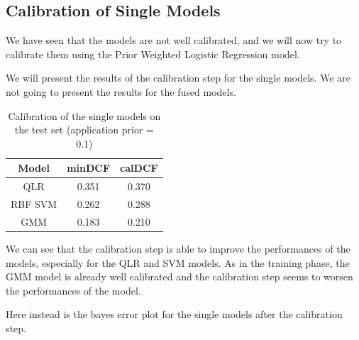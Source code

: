 \documentclass[12pt]{report}
\newcommand{\nl}{%
    \newline
    \noindent
}
\begin{document}
\subsection*{Calibration of Single Models}
We have seen that the models are not well calibrated, and we will now try to calibrate them using the Prior Weighted Logistic Regression model.
\nl
We will present the results of the calibration step for the single models. We are not going to present the results for the fused models.
\begin{table}[H]
    \centering
    \begin{tabular}{|c|c|c|}
        \hline
        \rowcolor{blue!10}
        \textbf{Model} & \textbf{minDCF} & \textbf{calDCF} \\
        \hline
        QLR            & 0.351           & 0.370           \\
        \hline
        RBF SVM        & 0.262           & 0.288           \\
        \hline
        GMM            & 0.183           & 0.210           \\
        \hline
    \end{tabular}
    \caption{Calibration of the single models on the test set (application prior = 0.1)}
    \label{tab:calibration_single_models}
\end{table}
\noindent
We can see that the calibration step is able to improve the performances of the models, especially for the QLR and SVM models. As in the training phase, the GMM model is already well calibrated and the calibration step seems to worsen the performances of the model.
\nl
Here instead is the bayes error plot for the single models after the calibration step.
\end{document}
